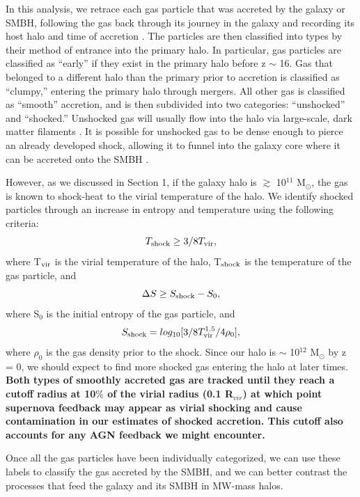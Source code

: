 \documentclass[]{emulateapj}
\begin{document}
In this analysis, we retrace each gas particle that was accreted by the galaxy or SMBH, following the gas back through its journey in the galaxy and recording its host halo and time of accretion \citep{Brooks2009}. The particles are then classified into types by their method of entrance into the primary halo. In particular, gas particles are classified as ``early'' if they exist in the primary halo before z $\sim$ 16. Gas that belonged to a different halo than the primary prior to accretion is classified as ``clumpy,'' entering the primary halo through mergers. All other gas is classified as ``smooth'' accretion, and is then subdivided into two categories: ``unshocked'' and ``shocked.'' Unshocked gas will usually flow into the halo via large-scale, dark matter filaments \citep{Keres2005,Bellovary2013}. It is possible for unshocked gas to be dense enough to pierce an already developed shock, allowing it to funnel into the galaxy core where it can be accreted onto the SMBH \citep{Nelson2013}. 

However, as we discussed in Section 1, if the galaxy halo is $\gtrsim$ 10$^{11}$ M$_{\odot} $, the gas is known to shock-heat to the virial temperature of the halo. We identify shocked particles through an increase in entropy and temperature using the following criteria:
\begin{equation}
T_{\rm shock} \geq 3/8 T_{\rm vir},
\end{equation}
where T$_{\rm vir}$ is the virial temperature of the halo, T$_{\rm shock}$ is the temperature of the gas particle, and 
\begin{equation}
\Delta S \geq S_{\rm shock} - S_0,
\end{equation}
where S$_0$ is the initial entropy of the gas particle, and 
\begin{equation}
S_{\rm shock} = log_{10}[3/8 T_{\rm vir}^{1.5}/4 \rho_0],
\end{equation}
where $\rho_0$ is the gas density prior to the shock. Since our halo is $\sim$ 10$^{12}$ M$_{\odot} $ by z = 0, we should expect to find more shocked gas entering the halo at later times. \textbf{Both types of smoothly accreted gas are tracked until they reach a cutoff radius at 10$\%$ of the virial radius (0.1 R$_{vir}$) at which point supernova feedback may appear as virial shocking and cause contamination in our estimates of shocked accretion. This cutoff also accounts for any AGN feedback we might encounter.}

Once all the gas particles have been individually categorized, we can use these labels to classify the gas accreted by the SMBH, and we can better contrast the processes that feed the galaxy and its SMBH in MW-mass halos.
\end{document}
